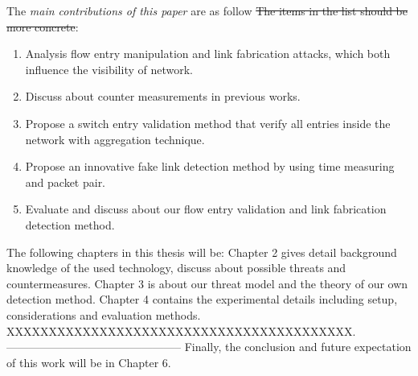 The \emph{main contributions of this paper} are as follow \sout{{\color{red} The items in the list should be more concrete}}:
\begin{enumerate}
\item
Analysis flow entry manipulation and link fabrication attacks, which both influence the visibility of network.
\item
Discuss about counter measurements in previous works.
\item
Propose a switch entry validation method that verify all entries inside the network with aggregation technique.	
\item
Propose an innovative fake link detection method by using time measuring and packet pair.
\item
Evaluate and discuss about our flow entry validation and link fabrication detection method.
\end{enumerate}

The following chapters in this thesis will be: Chapter 2 gives detail background knowledge of the used technology, discuss about possible threats and countermeasures. Chapter 3 is about our threat model and the theory of our own detection method. Chapter 4 contains the experimental details including setup, considerations and evaluation methods. XXXXXXXXXXXXXXXXXXXXXXXXXXXXXXXXXXXXXXXXX.
-----------------------------------------------
Finally, the conclusion and future expectation of this work will be in Chapter 6.